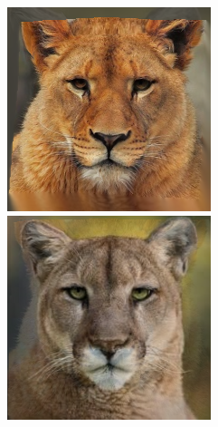 \documentclass[conference]{IEEEtran}
\begin{document}
\begin{figure}[H]
\begin{multicols}{3}
    \includegraphics[width=1.0\linewidth]{TestsCats/XL/img10.png} \par
    \includegraphics[width=1.0\linewidth]{TestsCats/XL/img40.png} \par


\end{multicols}
\end{figure}
\end{document}
